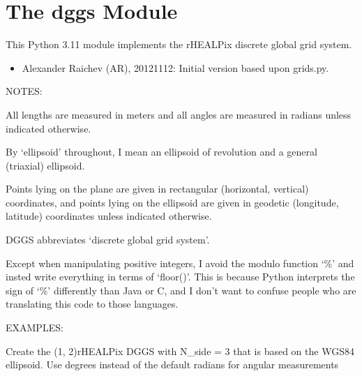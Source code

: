 \documentclass[a4paper,12ptopenany,oneside,english]{sphinxmanual}
\begin{document}
\chapter{The dggs Module}
\label{\detokenize{dggs:module-rhealpixdggs.dggs}}\label{\detokenize{dggs:the-dggs-module}}\label{\detokenize{dggs::doc}}
\sphinxAtStartPar
This Python 3.11 module implements the rHEALPix discrete global grid system.
\begin{itemize}
\item {} 
\sphinxAtStartPar
Alexander Raichev (AR), 2012\sphinxhyphen{}11\sphinxhyphen{}12: Initial version based upon grids.py.

\end{itemize}

\sphinxAtStartPar
NOTES:

\sphinxAtStartPar
All lengths are measured in meters and all angles are measured in radians
unless indicated otherwise.

\sphinxAtStartPar
By ‘ellipsoid’ throughout, I mean an ellipsoid of revolution and  a general (triaxial) ellipsoid.

\sphinxAtStartPar
Points lying on the plane are given in rectangular (horizontal, vertical) coordinates, and points lying on the ellipsoid are given in geodetic (longitude, latitude) coordinates unless indicated otherwise.

\sphinxAtStartPar
DGGS abbreviates ‘discrete global grid system’.

\sphinxAtStartPar
Except when manipulating positive integers, I avoid the modulo function ‘\%’
and insted write everything in terms of ‘floor()’.
This is because Python interprets the sign of ‘\%’ differently than
Java or C, and I don’t want to confuse people who are translating this code
to those languages.

\sphinxAtStartPar
EXAMPLES:

\sphinxAtStartPar
Create the (1, 2)\sphinxhyphen{}rHEALPix DGGS with N\_side = 3 that is based on the WGS84 ellipsoid. Use degrees instead of the default radians for angular measurements
\end{document}
